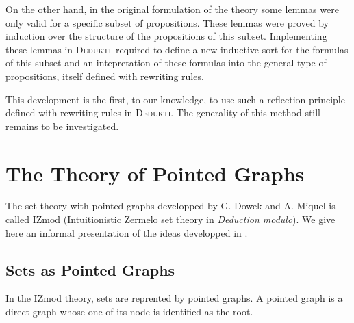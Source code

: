 \documentclass[submission,copyright,creativecommons]{eptcs}
\newcommand{\dedukti}{\textsc{Dedukti}}
\begin{document}
On the other hand, in the original formulation of the theory some lemmas were only valid for a specific subset of propositions. These lemmas were proved by induction over the structure of the propositions of this subset. Implementing these lemmas in \dedukti ~required to define a new inductive sort for the formulas of this subset and an intepretation of these formulas into the general type of  propositions, itself defined with rewriting rules. 

This development is the first, to our knowledge, to use such a reflection principle defined with rewriting rules in \dedukti. The generality of this method still remains to be investigated.

\section{The Theory of Pointed Graphs}

The set theory with pointed graphs developped by G. Dowek and A. Miquel is called IZmod (Intuitionistic Zermelo set theory in \textit{Deduction modulo}). We give here an informal presentation of the ideas developped in \cite{zermodulo}.

\subsection{Sets as Pointed Graphs}

\label{informal}

In the IZmod theory, sets are reprented by pointed graphs. A pointed graph is a direct graph whose one of its node is identified as the root. 
\end{document}
